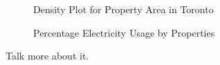 \documentclass[
  letterpaper,
  DIV=11,
  numbers=noendperiod]{scrartcl}
\begin{document}
\begin{figure}


\caption{\label{fig-Area}Density Plot for Property Area in Toronto}

\end{figure}%

\begin{figure}


\caption{\label{fig-Property}Percentage Electricity Usage by Properties}

\end{figure}%

Talk more about it.
\end{document}
